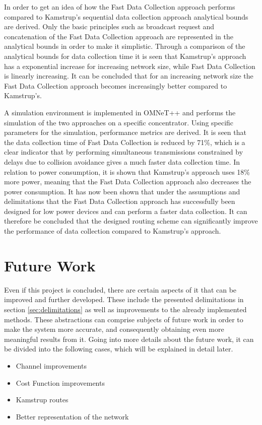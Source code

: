 In order to get an idea of how the Fast Data Collection approach performs compared to Kamstrup's sequential data collection approach analytical bounds are derived. Only the basic principles such as broadcast request and concatenation of the Fast Data Collection approach are represented in the analytical bounds in order to make it simplistic. Through a comparison of the analytical bounds for data collection time it is seen that Kamstrup's approach has a exponential increase for increasing network size, while Fast Data Collection is linearly increasing. It can be concluded that for an increasing network size the Fast Data Collection approach becomes increasingly better compared to Kamstrup's.

A simulation environment is implemented in OMNeT++ and performs the simulation of the two approaches on a specific concentrator. Using specific parameters for the simulation, performance metrics are derived. It is seen that the data collection time of Fast Data Collection is reduced by 71\%, which is a clear indicator that by performing simultaneous transmissions constrained by delays due to collision avoidance gives a much faster data collection time. In relation to power consumption, it is shown that Kamstrup's approach uses 18\% more power, meaning that the Fast Data Collection approach also decreases the power consumption. It has now been shown that under the assumptions and delimitations that the Fast Data Collection approach has successfully been designed for low power devices and can perform a faster data collection. It can therefore be concluded that the designed routing scheme can significantly improve the performance of data collection compared to Kamstrup's approach.

\section{Future Work}
Even if this project is concluded, there are certain aspects of it that can be improved and further developed. These include the presented delimitations in section \ref{sec:delimitations} as well as improvements to the already implemented methods. These abstractions can comprise subjects of future work in order to make the system more accurate, and consequently obtaining even more meaningful results from it. Going into more details about the future work, it can be divided into the following cases, which will be explained in detail later.

\begin{itemize}
\item Channel improvements
\item Cost Function improvements
\item Kamstrup routes
\item Better representation of the network
\end{itemize}

